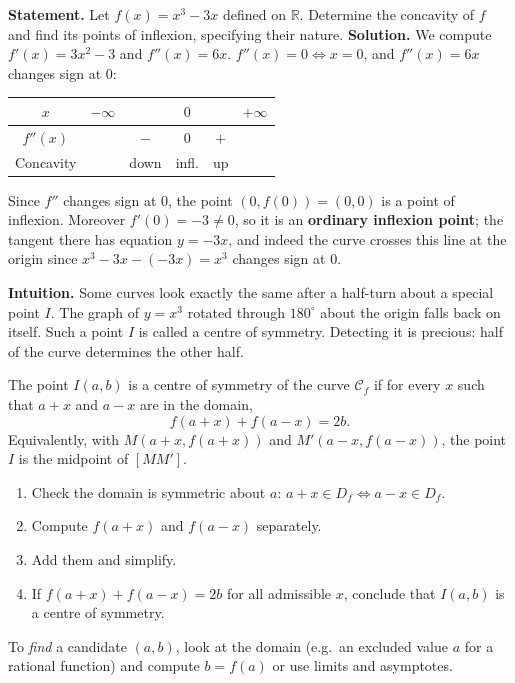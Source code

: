 \documentclass[11pt]{article}
\newcommand{\cle}[1]{{\popxbold\color{popdark}#1}}
\newcounter{popsec}
\newcounter{popsub}
\newcommand{\courssub}[1]{%
  \stepcounter{popsub}%
  \par\vspace{9pt}\noindent{\popxbold\fontsize{11.5}{13}\selectfont\color{popink}{\color{poporange}\thepopsec.\thepopsub}\hspace{6pt}#1}\par\nopagebreak\vspace{4pt}
}
\begin{document}
\begin{exoresolu}
\textbf{Statement.} Let $f(x) = x^3 - 3x$ defined on $\mathbb{R}$. Determine the concavity of $f$ and find its points of inflexion, specifying their nature.
\tcblower
\textbf{Solution.} We compute $f'(x) = 3x^2 - 3$ and $f''(x) = 6x$.
$f''(x) = 0 \iff x = 0$, and $f''(x) = 6x$ changes sign at $0$:
\begin{center}
\begin{tabular}{|c|ccccc|}
\hline
$x$ & $-\infty$ & & $0$ & & $+\infty$ \\ \hline
$f''(x)$ & & $-$ & $0$ & $+$ & \\ \hline
Concavity & & down & infl. & up & \\ \hline
\end{tabular}
\end{center}
Since $f''$ changes sign at $0$, the point $(0, f(0)) = (0,0)$ is a point of inflexion. Moreover $f'(0) = -3 \neq 0$, so it is an \textbf{ordinary inflexion point}; the tangent there has equation $y = -3x$, and indeed the curve crosses this line at the origin since $x^3 - 3x - (-3x) = x^3$ changes sign at $0$.
\end{exoresolu}

\courssub{Centre of Symmetry of a Curve}

\textbf{Intuition.} Some curves look exactly the same after a half-turn about a special point $I$. The graph of $y = x^3$ rotated through $180^{\circ}$ about the origin falls back on itself. Such a point $I$ is called a \cle{centre of symmetry}. Detecting it is precious: half of the curve determines the other half.

\begin{definition}
The point $I(a, b)$ is a \cle{centre of symmetry} of the curve $\mathcal{C}_f$ if for every $x$ such that $a+x$ and $a-x$ are in the domain,
\[ f(a+x) + f(a-x) = 2b. \]
Equivalently, with $M(a+x, f(a+x))$ and $M'(a-x, f(a-x))$, the point $I$ is the midpoint of $[MM']$.
\end{definition}

\begin{methode}
\begin{enumerate}
\item Check the domain is symmetric about $a$: $a+x \in D_f \iff a-x \in D_f$.
\item Compute $f(a+x)$ and $f(a-x)$ separately.
\item Add them and simplify.
\item If $f(a+x) + f(a-x) = 2b$ for all admissible $x$, conclude that $I(a,b)$ is a centre of symmetry.
\end{enumerate}
To \emph{find} a candidate $(a,b)$, look at the domain (e.g.\ an excluded value $a$ for a rational function) and compute $b = f(a)$ or use limits and asymptotes.
\end{methode}
\end{document}
